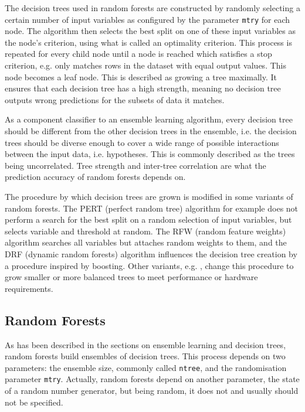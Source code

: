 \documentclass[a4paper,man,12pt,apacite,floatsintext,draftfirst]{apa6} %
\begin{document}
The decision trees used in random forests are constructed by randomly
selecting a certain number of input variables as configured by the parameter
\texttt{mtry} for each node.
The algorithm then selects the best split on one of these input
variables as the node's criterion, using what is called an optimality criterion.
This process is repeated for every child node until a node is reached
which satisfies a stop criterion, e.g.
only matches rows in the dataset with equal output values.
This node becomes a leaf node.
This is described as growing a tree maximally.
It ensures that each decision tree has a high strength,
meaning no decision tree outputs wrong predictions for the subsets of data
it matches. \cite{breiman2001random}

As a component classifier to an ensemble learning algorithm,
every decision tree should be different from the other decision trees in
the ensemble, i.e. the decision trees should be diverse enough
to cover a wide range of possible interactions between the input data,
i.e. hypotheses.
This is commonly described as the trees being uncorrelated.
Tree strength and inter-tree correlation are what the prediction accuracy
of random forests depends on. \cite{breiman2001random}

The procedure by which decision trees are grown is modified in some
variants of random forests.
The PERT (perfect random tree) algorithm \cite{cutler2001pert} for example does not perform a
search for the best split on a random selection of input variables,
but selects variable and threshold at random.
The RFW (random feature weights) algorithm \cite{maudes2012random} searches all variables but attaches random
weights to them, and the DRF (dynamic random forests) algorithm \cite{bernard2012dynamic} influences the
decision tree creation by a procedure inspired by boosting.
Other variants, e.g. , change this procedure to
grow smaller or more balanced trees to meet performance or
hardware requirements.

\subsection{Random Forests}
As has been described in the sections on ensemble learning and decision trees,
random forests build ensembles of decision trees.
This process depends on two parameters: the ensemble size, commonly called
\texttt{ntree}, and the randomisation parameter \texttt{mtry}.
Actually, random forests depend on another parameter,
the state of a random number generator, but being random,
it does not and usually should not be specified.
\end{document}
